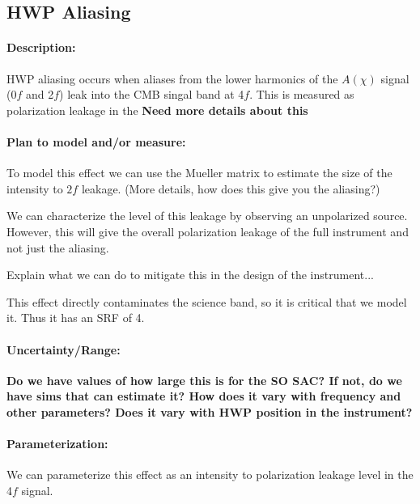 \subsection{HWP Aliasing}

\paragraph{Description:}
HWP aliasing occurs when aliases from the lower harmonics of the $A(\chi)$ signal (0$f$ and 2$f$) leak into the CMB singal band at 4$f$. This is measured as polarization leakage in the 
\textbf{Need more details about this}

\paragraph{Plan to model and/or measure:}
To model this effect we can use the Mueller matrix to estimate the size of the intensity to $2f$ leakage. (More details, how does this give you the aliasing?)

We can characterize the level of this leakage by observing an unpolarized source. However, this will give the overall polarization leakage of the full instrument and not just the aliasing.

Explain what we can do to mitigate this in the design of the instrument...

This effect directly contaminates the science band, so it is critical that we model it. Thus it has an SRF of 4.

\paragraph{Uncertainty/Range:}
\textbf{Do we have values of how large this is for the SO SAC? If not, do we have sims that can estimate it? How does it vary with frequency and other parameters? Does it vary with HWP position in the instrument?}

\paragraph{Parameterization:}
We can parameterize this effect as an intensity to polarization leakage level in the 4$f$ signal.
